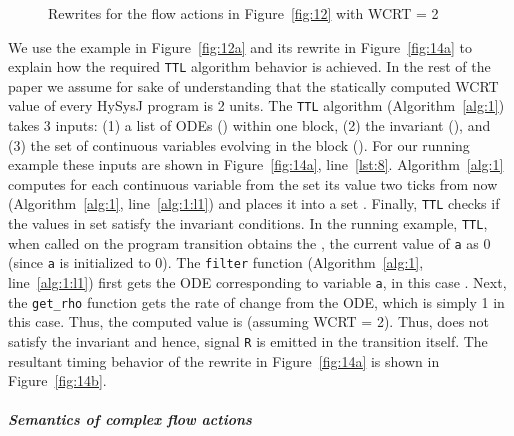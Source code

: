 \documentclass[10pt,journal,cspaper,compsoc]{IEEEtran}
\begin{document}
\begin{figure}[t!]
  \ContinuedFloat
  \centering
  \hspace{20pt}
  \caption{Rewrites for the flow actions in Figure~\ref{fig:12}
    with WCRT = 2}
  \label{fig:14}
\end{figure}



We use the example in Figure~\ref{fig:12a} and its rewrite in
Figure~\ref{fig:14a} to explain how the required \texttt{TTL} algorithm
behavior is achieved. In the rest of the paper we assume for sake of
understanding that the statically computed WCRT value of every HySysJ
program is 2 units. The \texttt{TTL} algorithm (Algorithm~\ref{alg:1})
takes 3 inputs: (1) a list of ODEs () within one 
block, (2) the  invariant (), and (3) the set of
continuous variables evolving in the  block
(). For our running example these inputs are shown in
Figure~\ref{fig:14a}, line~\ref{lst:8}. Algorithm~\ref{alg:1} computes
for each continuous variable from the set  its value two
ticks from now (Algorithm~\ref{alg:1}, line~\ref{alg:1:l1}) and places
it into a set . Finally, \texttt{TTL} checks if the values in
set  satisfy the invariant conditions. In the running example,
\texttt{TTL}, when called on the program transition  obtains the
, the current value of \texttt{a} as 0 (since \texttt{a} is
initialized to 0). The \texttt{filter} function (Algorithm~\ref{alg:1},
line~\ref{alg:1:l1}) first gets the ODE corresponding to variable
\texttt{a}, in this case . Next, the \texttt{get\_rho} function
gets the rate of change from the ODE, which is simply 1 in this
case. Thus, the computed  value is 
(assuming WCRT = 2). Thus,  does not satisfy the invariant
 and hence, signal \texttt{R} is emitted in the transition
 itself. The resultant timing behavior of the rewrite in
Figure~\ref{fig:14a} is shown in Figure~\ref{fig:14b}.











\paragraph{\textit{Semantics of complex flow actions}}
\label{sec:semant-compl-flow}
\end{document}
